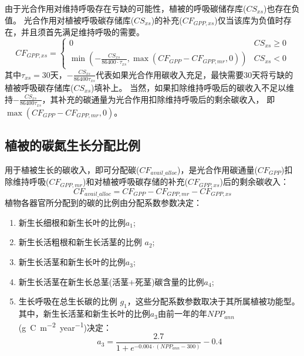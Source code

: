 由于光合作用对维持呼吸存在亏缺的可能性，植被的呼吸碳储存库($CS_{xs}$)也存在负值。
光合作用对植被呼吸碳存储库($CS_{xs}$)的补充($CF_{GPP,xs}$)仅当该库为负值时存在，并且须首先满足维持呼吸的需要。
\begin{equation}
CF_{GPP, xs}=\left\{\begin{array}{ll}0 & CS_{xs} \geqslant 0 \\ \min \left(-\frac{CS_{xs}}{86400 \cdot \tau_{xs}}, \max \left(CF_{GPP}-CF_{GPP, mr}, 0\right)\right) & CS_{xs}<0\end{array}\right.
\end{equation}
其中$\tau_{xs}=30$天，$-\frac{CS_{xs}}{86400 \tau_{xs}}$代表如果光合作用碳收入充足，最快需要30天将亏缺的植被呼吸碳存储库($CS_{xs}$)填补上。
当然，如果扣除维持呼吸后的碳收入不足以维持$-\frac{CS_{xs}}{86400 \tau_{xs}}$，其补充的碳通量为光合作用扣除维持呼吸后的剩余碳收入，
即$\max{\left(CF_{GPP}-CF_{GPP,mr},0\right)}$。


\subsection{植被的碳氮生长分配比例}\label{植被的碳氮生长分配比例}
用于植被生长的碳收入，即可分配碳($CF_{avail\_alloc}$)，是光合作用碳通量($CF_{GPP}$)扣除维持呼吸($CF_{GPP,mr}$)和对植被呼吸碳存储的补充($CF_{GPP,xs}$)后的剩余碳收入：
\begin{equation}
CF_{ {avail\_alloc }}=CF_{GPP}-CF_{GPP, mr}-CF_{GPP, xs}
\end{equation}
植物各器官所分配到的碳的比例由分配系数参数决定：
\begin{enumerate}
  \item 新生长细根和新生长叶的比例$a_1$; 
  \item 新生长活粗根和新生长活茎的比例 $a_2$;
  \item 新生长活茎和新生长叶的比例$a_3$;
  \item 新生长活茎在新生长总茎(活茎+死茎)碳含量的比例$a_4$;
  \item 生长呼吸在总生长碳的比例 $g_1$，这些分配系数参数取决于其所属植被功能型。其中，新生长活茎和新生长叶的比例$a_3$由前一年的年$NPP_{ann}$ (\unit{g.C.m^{-2}.year^{-1}})决定：
    \begin{equation}
      a_{3}=\frac{2.7}{1+e^{-0.004 \cdot\left(NPP_{ann}-300\right)}}-0.4
    \end{equation}
\end{enumerate}

